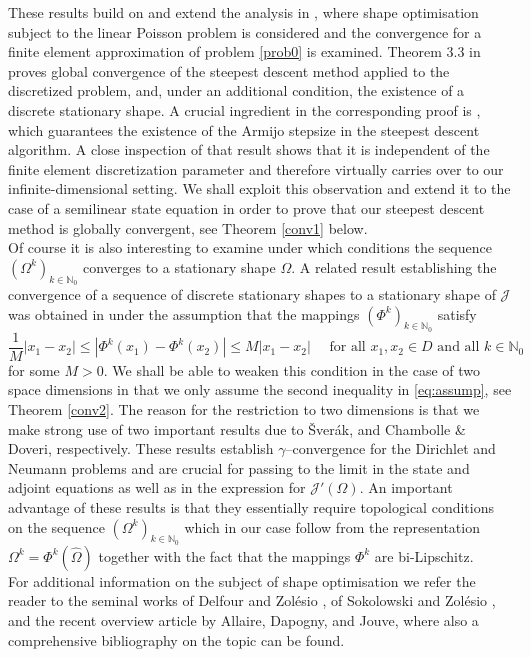 \documentclass[a4paper,10pt]{article}
\newcommand{\Omref}{\hat \Omega}
\theoremstyle{plain}
\theoremstyle{plain}
\numberwithin{equation}{section}
\begin{document}
These results build on and extend the analysis in \cite{DHH25-convergence}, where
shape optimisation subject to the linear Poisson problem is considered and the convergence for a finite element approximation of problem \eqref{prob0} is examined.  Theorem 3.3 in \cite{DHH25-convergence} proves global convergence of the steepest descent method applied to the discretized problem, and, under an additional condition, the existence of a  discrete stationary shape.  A crucial ingredient in the corresponding proof   is \cite[Lemma 3.2]{DHH25-convergence}, which guarantees the existence of the Armijo stepsize in the steepest descent algorithm. A close inspection of that result shows that it is independent of the finite element discretization parameter and therefore virtually carries over to our infinite-dimensional setting. We shall exploit this observation and  extend it to the case of a semilinear state equation in order
to prove that our steepest descent method is globally convergent, see 
Theorem \ref{conv1} below. \\

Of course  it is also interesting to examine under which conditions
the sequence $(\Omega^k)_{k \in \mathbb N_0}$ converges to a stationary shape $\Omega$. A related result
establishing the convergence of a sequence of discrete stationary shapes to a stationary shape of
$\mathcal J$ was obtained  in \cite[Theorem 4.7]{DHH25-convergence} under the assumption that the mappings $(\Phi^k)_{k \in \mathbb N_0}$ satisfy
\begin{equation} \label{eq:assump}
 \frac{1}{M} |x_1 - x_2 | \leq | \Phi^k(x_1) - \Phi^k(x_2) | \leq M | x_1 - x_2 | \quad \mbox{ for all } x_1,x_2 \in D \mbox{ and all } k \in \mathbb N_0
\end{equation}
for some $M>0$. We shall be able to weaken this condition in the case of two space dimensions in that we only
assume the second inequality in \eqref{eq:assump}, see Theorem \ref{conv2}. 
The reason for the  restriction  to two dimensions is that we make strong use
of two important results due to {\v{S}}ver{\'a}k, \cite{vsverak1993optimal} and Chambolle \& Doveri, \cite{ChamDov97} respectively.  These results establish $\gamma$--convergence for the Dirichlet and Neumann problems and are crucial for passing to the limit
in the state and adjoint equations as well as  in the expression for $\mathcal J'(\Omega)$. An important
advantage of these results is that they essentially require topological conditions on the 
sequence $(\Omega^k)_{k \in \mathbb N_0}$  which in our case follow from the representation $\Omega^k=\Phi^k(\Omref)$ together
with the fact that the mappings  $\Phi^k$ are bi-Lipschitz. \\
 For additional information on the subject of shape optimisation we refer the reader to the seminal works of Delfour and Zol\'esio \cite{DelZol11},  of Sokolowski and Zol\'esio \cite{SZ92}, and the recent overview article \cite{ADJ21} by Allaire, Dapogny, and Jouve, where also a comprehensive  bibliography on the topic can be found.
\end{document}
